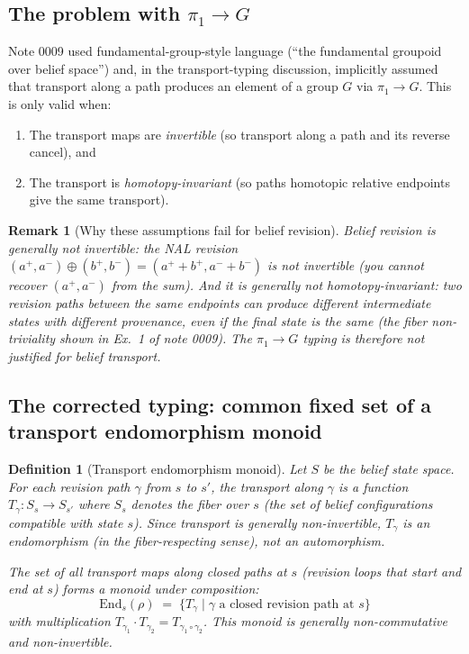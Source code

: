 \documentclass[11pt]{article}
\newtheorem{definition}{Definition}
\newtheorem{remark}{Remark}
\newcommand{\End}{\mathrm{End}}
\begin{document}
\subsection{The problem with $\pi_1 \to G$}

Note 0009 used fundamental-group-style language (``the fundamental groupoid over belief space'')
and, in the transport-typing discussion, implicitly assumed that transport along a path
produces an element of a group $G$ via $\pi_1 \to G$. This is only valid when:

\begin{enumerate}
  \item The transport maps are \emph{invertible} (so transport along a path and its reverse
        cancel), and
  \item The transport is \emph{homotopy-invariant} (so paths homotopic relative endpoints give
        the same transport).
\end{enumerate}

\begin{remark}[Why these assumptions fail for belief revision]
Belief revision is generally \emph{not invertible}: the NAL revision $(a^+, a^-) \oplus
(b^+, b^-) = (a^+ + b^+, a^- + b^-)$ is not invertible (you cannot recover $(a^+, a^-)$ from
the sum). And it is generally \emph{not homotopy-invariant}: two revision paths between the
same endpoints can produce different intermediate states with different provenance, even if
the final state is the same (the fiber non-triviality shown in Ex.~1 of note 0009). The
$\pi_1 \to G$ typing is therefore not justified for belief transport.
\end{remark}

\subsection{The corrected typing: common fixed set of a transport endomorphism monoid}

\begin{definition}[Transport endomorphism monoid]
\label{def:transport-monoid}
Let $S$ be the belief state space. For each revision path $\gamma$ from $s$ to $s'$, the
transport along $\gamma$ is a function $T_\gamma : S_s \to S_{s'}$ where $S_s$ denotes the
fiber over $s$ (the set of belief configurations compatible with state $s$). Since
transport is generally non-invertible, $T_\gamma$ is an endomorphism (in the fiber-respecting
sense), not an automorphism.

The set of all transport maps along closed paths at $s$ (revision loops that start and end
at $s$) forms a \emph{monoid} under composition:
\[
  \End_s(\rho) \;=\; \{ T_\gamma \mid \gamma \text{ a closed revision path at } s \}
\]
with multiplication $T_{\gamma_1} \cdot T_{\gamma_2} = T_{\gamma_1 \circ \gamma_2}$.
This monoid is generally non-commutative and non-invertible.
\end{definition}
\end{document}
